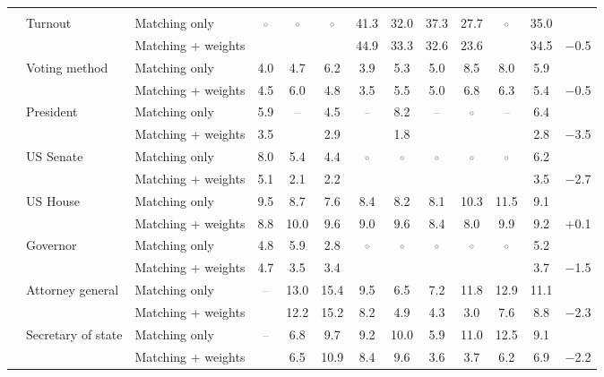 \begin{table}[!htbp]
{\begin{threeparttable}
\begin{tabular}{llcccccccccc}
\addlinespace[0.3em]
\multicolumn{12}{l}{Non-demographic} \\
\addlinespace[0.1em]
~~Turnout & Matching only & \textcolor{gray}{$\circ$} & \textcolor{gray}{$\circ$} & \textcolor{gray}{$\circ$} & 41.3 & 32.0 & 37.3 & 27.7 & \textcolor{gray}{$\circ$} & 35.0 & \\
 & Matching + weights &  &  &  & 44.9 & 33.3 & 32.6 & 23.6 &  & 34.5 & $-$0.5 \\
\addlinespace[0.1em]
~~Voting method & Matching only & 4.0 & 4.7 & 6.2 & 3.9 & 5.3 & 5.0 & 8.5 & 8.0 & 5.9 & \\
 & Matching + weights & 4.5 & 6.0 & 4.8 & 3.5 & 5.5 & 5.0 & 6.8 & 6.3 & 5.4 & $-$0.5 \\
\addlinespace[0.1em]
~~President & Matching only & 5.9 & \textcolor{gray}{--} & 4.5 & \textcolor{gray}{--} & 8.2 & \textcolor{gray}{--} & \textcolor{gray}{$\circ$} & \textcolor{gray}{--} & 6.4 & \\
 & Matching + weights & 3.5 &  & 2.9 &  & 1.8 &  &  &  & 2.8 & $-$3.5 \\
\addlinespace[0.1em]
~~US Senate & Matching only & 8.0 & 5.4 & 4.4 & \textcolor{gray}{$\circ$} & \textcolor{gray}{$\circ$} & \textcolor{gray}{$\circ$} & \textcolor{gray}{$\circ$} & \textcolor{gray}{$\circ$} & 6.2 & \\
 & Matching + weights & 5.1 & 2.1 & 2.2 &  &  &  &  &  & 3.5 & $-$2.7 \\
\addlinespace[0.1em]
~~US House & Matching only & 9.5 & 8.7 & 7.6 & 8.4 & 8.2 & 8.1 & 10.3 & 11.5 & 9.1 & \\
 & Matching + weights & 8.8 & 10.0 & 9.6 & 9.0 & 9.6 & 8.4 & 8.0 & 9.9 & 9.2 & +0.1 \\
\addlinespace[0.1em]
~~Governor & Matching only & 4.8 & 5.9 & 2.8 & \textcolor{gray}{$\circ$} & \textcolor{gray}{$\circ$} & \textcolor{gray}{$\circ$} & \textcolor{gray}{$\circ$} & \textcolor{gray}{$\circ$} & 5.2 & \\
 & Matching + weights & 4.7 & 3.5 & 3.4 &  &  &  &  &  & 3.7 & $-$1.5 \\
\addlinespace[0.1em]
~~Attorney general & Matching only & \textcolor{gray}{--} & 13.0 & 15.4 & 9.5 & 6.5 & 7.2 & 11.8 & 12.9 & 11.1 & \\
 & Matching + weights &  & 12.2 & 15.2 & 8.2 & 4.9 & 4.3 & 3.0 & 7.6 & 8.8 & $-$2.3 \\
\addlinespace[0.1em]
~~Secretary of state & Matching only & \textcolor{gray}{--} & 6.8 & 9.7 & 9.2 & 10.0 & 5.9 & 11.0 & 12.5 & 9.1 & \\
 & Matching + weights &  & 6.5 & 10.9 & 8.4 & 9.6 & 3.6 & 3.7 & 6.2 & 6.9 & $-$2.2 \\

\end{tabular}
\end{threeparttable}}
\end{table}
